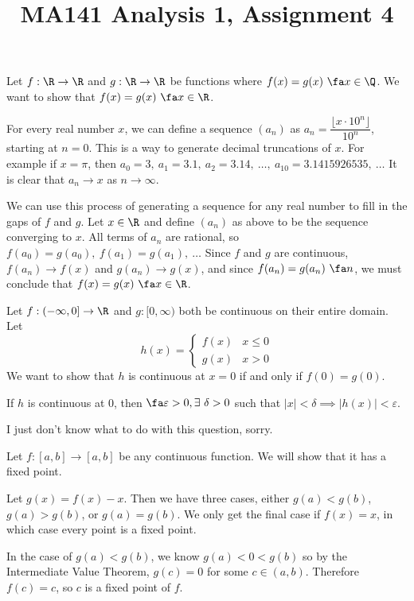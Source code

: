 \documentclass[a4paper]{article}
\title{MA141 Analysis 1, Assignment 4}
\begin{document}
\maketitle

\setlength{\parindent}{0em}
\setlength{\parskip}{1em}


Let $f : \R \to \R$ and $g : \R \to \R$ be functions where $f(x) = g(x)\ \fa x \in \Q$. We want to show that $f(x) = g(x)\ \fa x \in \R$.

For every real number $x$, we can define a sequence $(a_n)$ as $a_n = \dfrac{\lfloor x \cdot 10^n \rfloor}{10^n}$, starting at $n=0$. This is a way to generate decimal truncations of $x$. For example if $x = \pi$, then $a_0 = 3,\ a_1 = 3.1,\ a_2 = 3.14,\ \ldots,\ a_{10} = 3.1415926535,\ \ldots$ It is clear that $a_n \to x$ as $n \to \infty$.

We can use this process of generating a sequence for any real number to fill in the gaps of $f$ and $g$. Let $x \in \R$ and define $(a_n)$ as above to be the sequence converging to $x$. All terms of $a_n$ are rational, so $f(a_0) = g(a_0),\ f(a_1) = g(a_1),\ \ldots$ Since $f$ and $g$ are continuous, $f(a_n) \to f(x)$ and $g(a_n) \to g(x)$, and since $f(a_n) = g(a_n)\ \fa n$, we must conclude that $f(x) = g(x)\ \fa x \in \R$.


Let $f : (-\infty, 0] \to \R$ and $g : [0, \infty)$ both be continuous on their entire domain. Let $$h(x) = \begin{cases}
	f(x) & x \le 0\\
	g(x) & x > 0
\end{cases}$$We want to show that $h$ is continuous at $x=0$ if and only if $f(0) = g(0)$.

If $h$ is continuous at 0, then $\fa \varepsilon > 0, \exists\ \delta > 0$ such that $|x| < \delta \implies |h(x)| < \varepsilon$.

I just don't know what to do with this question, sorry.


Let $f : [a, b] \to [a, b]$ be any continuous function. We will show that it has a fixed point.

Let $g(x) = f(x) - x$. Then we have three cases, either $g(a) < g(b)$, $g(a) > g(b)$, or $g(a) = g(b)$. We only get the final case if $f(x) = x$, in which case every point is a fixed point.

In the case of $g(a) < g(b)$, we know $g(a) < 0 < g(b)$
so by the Intermediate Value Theorem, $g(c) = 0$ for some $c \in (a, b)$. Therefore $f(c) = c$, so $c$ is a fixed point of $f$.
\end{document}
